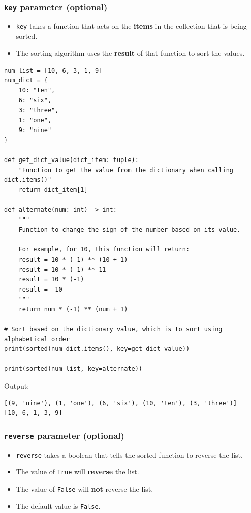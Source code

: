 \documentclass[11pt]{article}
\begin{document}
 \newpage

\subsubsection{\texttt{key} parameter (optional)}
\label{sec:org1ef3de1}
\begin{itemize}
\item \texttt{key} takes a function that acts on the \textbf{items} in the collection that is being sorted.
\item The sorting algorithm uses the \textbf{result} of that function to sort the values.
\end{itemize}

\begin{verbatim}
num_list = [10, 6, 3, 1, 9]
num_dict = {
    10: "ten",
    6: "six",
    3: "three",
    1: "one",
    9: "nine"
}

def get_dict_value(dict_item: tuple):
    "Function to get the value from the dictionary when calling dict.items()"
    return dict_item[1]

def alternate(num: int) -> int:
    """
    Function to change the sign of the number based on its value.

    For example, for 10, this function will return:
    result = 10 * (-1) ** (10 + 1)
    result = 10 * (-1) ** 11
    result = 10 * (-1)
    result = -10
    """
    return num * (-1) ** (num + 1)

# Sort based on the dictionary value, which is to sort using alphabetical order
print(sorted(num_dict.items(), key=get_dict_value))

print(sorted(num_list, key=alternate))
\end{verbatim}

 \noindent Output:

\begin{verbatim}
[(9, 'nine'), (1, 'one'), (6, 'six'), (10, 'ten'), (3, 'three')]
[10, 6, 1, 3, 9]
\end{verbatim}

\subsubsection{\texttt{reverse} parameter (optional)}
\label{sec:org1c1f46b}
\begin{itemize}
\item \texttt{reverse} takes a boolean that tells the sorted function to reverse the list.
\item The value of \texttt{True} will \textbf{reverse} the list.
\item The value of \texttt{False} will \textbf{not} reverse the list.
\item The default value is \texttt{False}.
\end{itemize}
\end{document}

